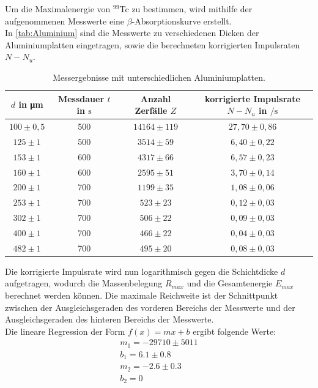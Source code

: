 Um die Maximalenergie von $^{99}$Tc zu bestimmen, wird mithilfe der aufgenommenen Messwerte eine
$\beta$-Absorptionskurve erstellt.\\
In \autoref{tab:Aluminium} sind die Messwerte zu verschiedenen Dicken der Aluminiumplatten eingetragen,
sowie die berechneten korrigierten Impulsraten $N - N_u$.
\begin{table}
  \centering
  \caption{Messergebnisse mit unterschiedlichen Aluminiumplatten.}
  \label{tab:Aluminium}
  \begin{tabular}{c c c c}
    $d$ in \si{\micro\meter} & Messdauer $t$ in $\si{\second}$ & Anzahl Zerfälle $Z$  &  korrigierte Impulsrate $N-N_u$ in $\si{\per\second}$\\
       \midrule
       $100 \pm 0,5$ &    500  &   $14164 \pm 119$  & $27,70 \pm 0,86$ \\
       $125 \pm 1$ &   500   &   $3514 \pm 59$  &     $6,40 \pm 0,22$\\
       $153 \pm 1$  & 600   &   $4317 \pm 66$ &       $6,57 \pm 0,23$\\
       $160 \pm 1$  &  600  &    $2595 \pm 51$  &     $3,70 \pm 0,14$\\
       $200 \pm 1$  & 700    &  $1199 \pm 35$ &       $1,08 \pm 0,06$\\
       $253 \pm 1$  &  700   &    $523 \pm 23$  &     $0,12 \pm 0,03$\\
       $302 \pm 1$  & 700    &  $ 506 \pm 22$ &       $0,09 \pm 0,03$\\
       $400 \pm 1$  & 700   &    $466 \pm 22$ &       $0,04 \pm 0,03$\\
       $482 \pm 1$  &  700  &    $ 495 \pm 20$  &     $0,08 \pm 0,03$\\
      \bottomrule
    \end{tabular}
\end{table}
Die korrigierte Impulsrate wird nun logarithmisch gegen die Schichtdicke $d$ aufgetragen, wodurch die
Massenbelegung $R_{max}$ und die Gesamtenergie $E_{max}$ berechnet werden können. Die maximale Reichweite
ist der Schnittpunkt zwischen der Ausgleichsgeraden des vorderen Bereichs der Messwerte und der Ausgleichsgeraden
des hinteren Bereichs der Messwerte.\\
Die lineare Regression der Form $f(x) =mx+b$ ergibt folgende Werte:
\begin{align*}
  m_1 = -29710 \pm 5011 \\
  b_1 = 6.1 \pm 0.8 \\
  m_2 = -2.6 \pm 0.3 \\
  b_2 = 0 \\
\end{align*}
